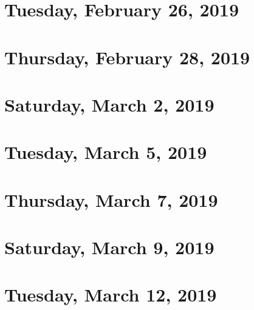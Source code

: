 \documentclass[reqno]{amsart}
\begin{document}
\section{Tuesday, February 26, 2019}
    

\section{Thursday, February 28, 2019}
    

\section{Saturday, March 2, 2019}
    

\section{Tuesday, March 5, 2019}
    

\section{Thursday, March 7, 2019}
    

\section{Saturday, March 9, 2019}
    

\section{Tuesday, March 12, 2019}
    
\end{document}
